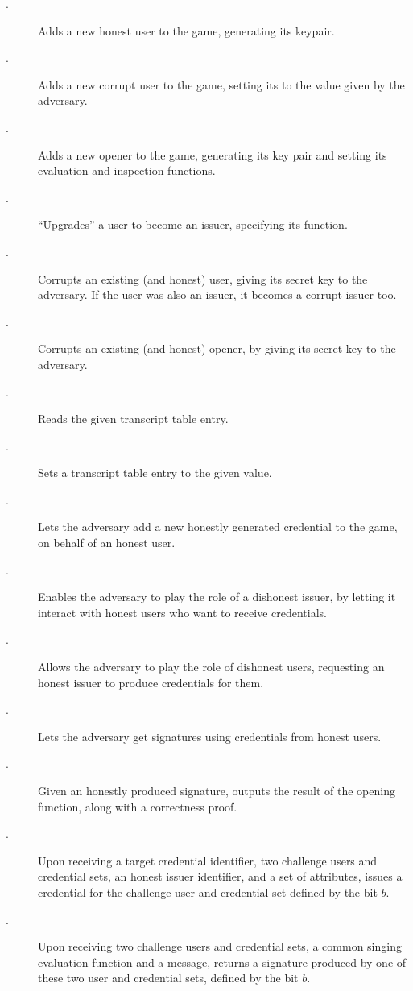\begin{description}
\item[\HUGEN.] Adds a new honest user to the game, generating its keypair.
\item[\CUGEN.] Adds a new corrupt user to the game, setting its \upk to the
  value given by the adversary.  
\item[\OGEN.] Adds a new opener to the game, generating its key pair and
  setting its evaluation and inspection functions.
\item[\ISET.] ``Upgrades'' a user to become an issuer, specifying its
  \fissue function.
\item[\UCORR.] Corrupts an existing (and honest) user, giving its secret
  key to the adversary. If the user was also an issuer, it becomes a corrupt
  issuer too.
\item[\OCORR.] Corrupts an existing (and honest) opener, by giving its secret
  key to the adversary.
\item[\RREG.] Reads the given transcript table entry.
\item[\WREG.] Sets a transcript table entry to the given value.
\item[\OBTISS.] Lets the adversary add a new honestly generated credential to
  the game, on behalf of an honest user.
\item[\OBTAIN.] Enables the adversary to play the role of a dishonest issuer, by
  letting it interact with honest users who want to receive credentials.
\item[\ISSUE.] Allows the adversary to play the role of dishonest users,
  requesting an honest issuer to produce credentials for them.
\item[\SIGN.] Lets the adversary get signatures using credentials from honest
  users.
\item[\OPEN.] Given an honestly produced signature, outputs the result of the
  opening function, along with a correctness proof.
\item[\OBTCHALb.] Upon receiving a target credential identifier, two challenge
  users and credential sets, an honest issuer identifier, and a set of
  attributes, issues a credential for the challenge user and credential set
  defined by the bit $b$. 
\item[\CHALb.] Upon receiving two challenge users and credential sets, a common
  singing evaluation function and a message, returns a signature produced by one
  of these two user and credential sets, defined by the bit $b$.
\end{description}

